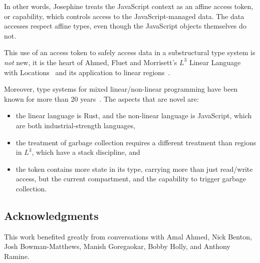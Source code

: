 In other words, Josephine treats the JavaScript context as an affine
access token, or capability, which controls access to the JavaScript-managed
data. The data accesses respect affine types, even though the JavaScript objects
themselves do not.

This use of an access token to safely access data in a substructural
type system is \emph{not} new, it is the heart of Ahmed, Fluet and
Morrisett's $L^3$ Linear Language with Locations~\cite{l3} and its
application to linear regions~\cite{regions}.

Moreover, type systems for mixed linear/non-linear programming have
been known for more than 20 years~\cite{mixed}.
The aspects that are novel are:
\begin{itemize}

\item the linear language is Rust, and the non-linear language is
  JavaScript, which are both industrial-strength languages,

\item the treatment of garbage collection requires a
  different treatment than regions in $L^3$, which have a stack
  discipline, and

\item the token contains more state in its type, carrying more than
  just read/write access, but the current compartment, and the capability
  to trigger garbage collection.

\end{itemize}

\subsection*{Acknowledgments}

This work benefited greatly from conversations with
Amal Ahmed,
Nick Benton,
Josh Bowman-Matthews,
Manish Goregaokar,
Bobby Holly, and
Anthony Ramine.
